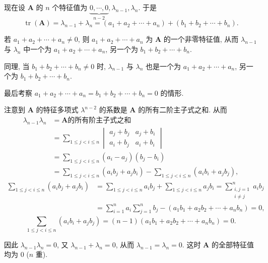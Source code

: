 \documentclass[../../main.tex]{subfiles}%
\begin{document}
\begin{solution}
现在设 $\boldsymbol{A}$ 的 $n$ 个特征值为 $\underbrace{0, \cdots, 0}_{n - 2}, \lambda_{n - 1}, \lambda_n$. 于是
$$
\operatorname{tr}(\boldsymbol{A}) = \lambda_{n - 1} + \lambda_n = (a_1 + a_2 + \cdots + a_n) + (b_1 + b_2 + \cdots + b_n).
$$

若 $a_1 + a_2 + \cdots + a_n \neq 0$, 则 $a_1 + a_2 + \cdots + a_n$ 为 $\boldsymbol{A}$ 的一个非零特征值, 从而 $\lambda_{n - 1}$ 与 $\lambda_n$ 中一个为 $a_1 + a_2 + \cdots + a_n$, 另一个为 $b_1 + b_2 + \cdots + b_n$.

同理, 当 $b_1 + b_2 + \cdots + b_n \neq 0$ 时, $\lambda_{n - 1}$ 与 $\lambda_n$ 也是一个为 $a_1 + a_2 + \cdots + a_n$, 另一个为 $b_1 + b_2 + \cdots + b_n$.

最后考察 $a_1 + a_2 + \cdots + a_n = b_1 + b_2 + \cdots + b_n = 0$ 的情形.

注意到 $\boldsymbol{A}$ 的特征多项式 $\lambda^{n - 2}$ 的系数是 $\boldsymbol{A}$ 的所有二阶主子式之和. 从而
$$
\begin{aligned}
\lambda_{n - 1}\lambda_n &= \boldsymbol{A} \text{的所有阶主子式之和} \\
&= \sum_{1 \leqslant j < i \leqslant n} \begin{vmatrix} a_j + b_j & a_j + b_i \\ a_i + b_j & a_i + b_i \end{vmatrix} \\
&= \sum_{1 \leqslant j < i \leqslant n} (a_i - a_j)(b_j - b_i) \\
&= \sum_{1 \leqslant j < i \leqslant n} (a_ib_j + a_jb_i) - \sum_{1 \leqslant j < i \leqslant n} (a_ib_i + a_jb_j),
\end{aligned}
$$
$$
\begin{aligned}
\sum_{1 \leqslant j < i \leqslant n} (a_ib_j + a_jb_i) &= \sum_{1 \leqslant j < i \leqslant n} a_ib_j + \sum_{1 \leqslant j < i \leqslant n} a_jb_i = \sum_{\substack{i, j = 1 \\ i \neq j}}^n a_ib_j \\
&= \sum_{i = 1}^n a_i \sum_{j = 1}^n b_j - (a_1b_1 + a_2b_2 + \cdots + a_nb_n) = 0,
\end{aligned}
$$
$$
\sum_{1 \leqslant j < i \leqslant n} (a_ib_i + a_jb_j) = (n - 1)(a_1b_1 + a_2b_2 + \cdots + a_nb_n) = 0.
$$

因此 $\lambda_{n - 1}\lambda_n = 0$, 又 $\lambda_{n - 1} + \lambda_n = 0$, 从而 $\lambda_{n - 1} = \lambda_n = 0$. 这时 $\boldsymbol{A}$ 的全部特征值均为 $0$ ($n$ 重).


\end{solution}
\end{document}
